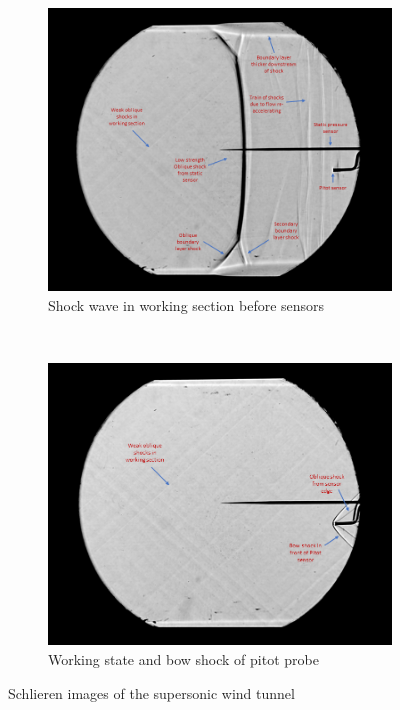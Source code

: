\documentclass{article}
\begin{document}
\begin{figure}[H]
    \centering
    \begin{subfigure}[t]{0.48\textwidth}
        \centering
        \includegraphics[width=1\textwidth]{../Supersonic_Nozzle/shadowgraph_annotations/slide1.PNG}
        \caption{Shock wave in working section before sensors}

        \label{fig:figure6}
    \end{subfigure}
    ~
    \begin{subfigure}[t]{0.48\textwidth}
        \centering
        \includegraphics[width=1\textwidth]{../Supersonic_Nozzle/shadowgraph_annotations/slide2.PNG}
        \caption{Working state and bow shock of pitot probe}
        \label{fig:figure7}
    \end{subfigure}
    \caption{Schlieren images of the supersonic wind tunnel}
\end{figure}
\end{document}
